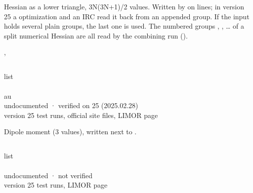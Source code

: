 \documentclass[letterpaper,10pt,english,openany,oneside]{sphinxmanual}
\begin{document}
\sphinxAtStartPar
Hessian as a lower triangle, 3N(3N+1)/2 values. Written by  on  lines; in version 25 a
 optimization and an IRC read it back from an appended  group. If the input holds several
plain  groups, the last one is used. The numbered groups , , … of a split
numerical Hessian are all read by the combining run ().

\sphinxAtStartPar
{} {\hyperref[\detokenize{reference/optimize:optimize-saddle}]{}}, {\hyperref[\detokenize{reference/d2edr2:d2edr2-steps}]{}}


\subsection{}
\label{\detokenize{reference/Energy:d}}\label{\detokenize{reference/Energy:energy-d}}
\ignorespaces 
\sphinxAtStartPar
{} list\\
 \\
 au\\
 undocumented · verified on 25 (2025.02.28)\\
 version 25 test runs, official site files, LIMOR page

\sphinxAtStartPar
Dipole moment (3 values), written next to .


\subsection{}
\label{\detokenize{reference/Energy:dx}}\label{\detokenize{reference/Energy:energy-dx}}
\ignorespaces 
\sphinxAtStartPar
{} list\\
 \\
 undocumented · not verified\\
 version 25 test runs, LIMOR page
\end{document}
